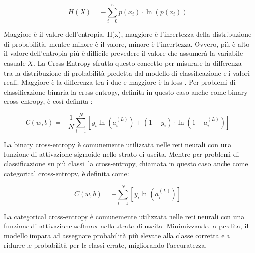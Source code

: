 \begin{equation}
    H(X) = - \sum_{i=0}^{n}  p(x_i)\cdot \ln(p(x_i))
\end{equation}

Maggiore è il valore dell'entropia, H(x), maggiore è l'incertezza della 
distribuzione di probabilità, mentre minore è il valore, minore è l'incertezza.
Ovvero, più è alto il valore dell'entropia più è difficile prevedere il valore 
che assumerà la variabile casuale $X$. 
La Cross-Entropy sfrutta questo concetto per misurare la differenza tra la distribuzione di 
probabilità predetta dal modello di classificazione e i valori reali. 
Maggiore è la differenza tra i due e maggiore è la loss \cite{CrossEntropy_DataCamp, CrossEntropy_365DataScience,CrossEntropy_Wikipedia}.
Per problemi di classificazione binaria la cross-entropy, definita in questo caso 
anche come binary cross-entropy, è così definita 
\cite{CrossEntropy_DataCamp, GradientDescent_NeuralNetworks}:

\begin{equation}
    C(w, b) = -\frac{1}{N}\sum_{i=1}^{N}\left[y_i \ln(a_i^{(L)}) + (1-y_i)\cdot \ln(1 - a_i^{(L)})\right]
\end{equation}

La binary cross-entropy è comunemente utilizzata nelle reti neurali con una 
funzione di attivazione sigmoide nello strato di uscita.
Mentre per problemi di classificazione su più classi, la cross-entropy, chiamata in 
questo caso anche come categorical cross-entropy, è definita come:

\begin{equation}
    C(w, b) = -\sum_{i=1}^{N}\left[y_i \ln(a_i^{(L)})\right]
\end{equation}

La categorical cross-entropy è comunemente utilizzata nelle reti neurali con una 
funzione di attivazione softmax nello strato di uscita. Minimizzando la perdita, 
il modello impara ad assegnare probabilità più elevate alla classe corretta e a 
ridurre le probabilità per le classi errate, migliorando l'accuratezza.

